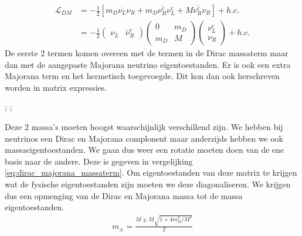 \documentclass[../main.tex]{subfiles}
\begin{document}
\begin{equation}
    \begin{aligned}
        \label{eq:dirac_majorana_massaterm}
        \mathcal{L}_{D M} &=-\frac{1}{2}\left[m_{D} \overline{\nu_{L}} \nu_{R}+m_{D} \overline{\nu_{R}^{c}} \nu_{L}^{c}+M \overline{\nu_{R}^{c}} \nu_{R}\right]+h . c . \\
                          &=-\frac{1}{2}\left(\begin{array}{cc}
                                  \nu_{L} & \bar{\nu}_{R}^{c}
                                  \end{array}\right)\left(\begin{array}{cc}
                                  0 & m_{D} \\
                                  m_{D} & M
                                  \end{array}\right)\left(\begin{array}{c}
                                  \nu_{L}^{c} \\
                                  \nu_{R}
                          \end{array}\right)+h . c .
    \end{aligned}
\end{equation}
De eerste 2 termen komen overeen met de termen in de Dirac massaterm maar dan met de aangepaste Majorana neutrino eigentoestanden. Er is ook een extra Majorana term en het hermetisch toegevoegde. Dit kon dan ook herschreven worden in matrix expressies.\\
\begin{center}
    ;
    ;
\end{center}
Deze 2 massa's moeten hoogst waarschijnlijk verschillend zijn. We hebben bij neutrinos een Dirac en Majorana complonent maar anderzijds hebben we ook massaeigentoestanden. We gaan dus weer een rotatie moeten doen van de ene basis naar de andere. Deze is gegeven in vergelijking \ref{eq:dirac_majorana_massaterm}. Om eigentoestanden van deze matrix te krijgen wat de fysische eigentoestanden zijn moeten we deze diagonaliseren. We krijgen dus een opmenging van de Dirac en Majorana massa tot de massa eigentoestanden.
\begin{equation}
    \begin{aligned}
        \label{eq:dirac_majorana_massa_opmenging}
        m_{\pm}=\frac{M \pm M \sqrt{1+4 m_{D}^{2} / M^{2}}}{2}
    \end{aligned}
\end{equation}
\end{document}
